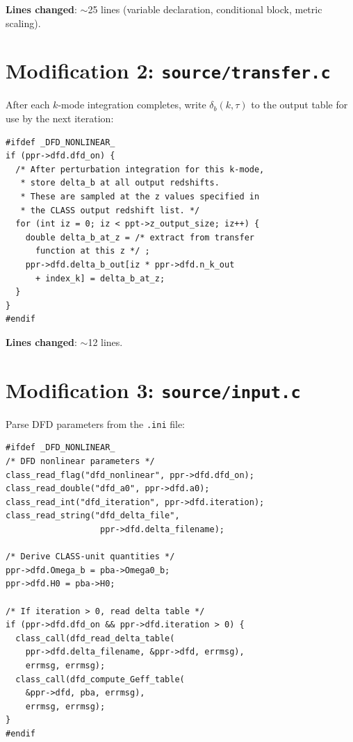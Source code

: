 \documentclass[11pt]{article}
\theoremstyle{definition}
\theoremstyle{remark}
\begin{document}
\textbf{Lines changed}: $\sim$25 lines (variable declaration, conditional
block, metric scaling).


\section{Modification 2: \texttt{source/transfer.c}}

After each $k$-mode integration completes, write $\delta_b(k, \tau)$
to the output table for use by the next iteration:

\begin{lstlisting}[numbers=none,caption={Patch to transfer.c: output delta\_b grid}]
#ifdef _DFD_NONLINEAR_
if (ppr->dfd.dfd_on) {
  /* After perturbation integration for this k-mode,
   * store delta_b at all output redshifts.
   * These are sampled at the z values specified in
   * the CLASS output redshift list. */
  for (int iz = 0; iz < ppt->z_output_size; iz++) {
    double delta_b_at_z = /* extract from transfer
      function at this z */ ;
    ppr->dfd.delta_b_out[iz * ppr->dfd.n_k_out
      + index_k] = delta_b_at_z;
  }
}
#endif
\end{lstlisting}

\textbf{Lines changed}: $\sim$12 lines.


\section{Modification 3: \texttt{source/input.c}}

Parse DFD parameters from the \texttt{.ini} file:

\begin{lstlisting}[numbers=none,caption={Patch to input.c: parameter parsing}]
#ifdef _DFD_NONLINEAR_
/* DFD nonlinear parameters */
class_read_flag("dfd_nonlinear", ppr->dfd.dfd_on);
class_read_double("dfd_a0", ppr->dfd.a0);
class_read_int("dfd_iteration", ppr->dfd.iteration);
class_read_string("dfd_delta_file",
                   ppr->dfd.delta_filename);

/* Derive CLASS-unit quantities */
ppr->dfd.Omega_b = pba->Omega0_b;
ppr->dfd.H0 = pba->H0;

/* If iteration > 0, read delta table */
if (ppr->dfd.dfd_on && ppr->dfd.iteration > 0) {
  class_call(dfd_read_delta_table(
    ppr->dfd.delta_filename, &ppr->dfd, errmsg),
    errmsg, errmsg);
  class_call(dfd_compute_Geff_table(
    &ppr->dfd, pba, errmsg),
    errmsg, errmsg);
}
#endif
\end{lstlisting}
\end{document}
